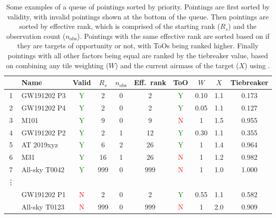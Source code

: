 \begin{colsection}
\begin{colsection}
\begin{table}[t]
    \begin{center}
        \begin{tabular}{c|l|c|ccc|c|ccc} %
            & Name & Valid & $R_s$ & $n_\text{obs}$ & Eff.\ rank & ToO & $W$ & $X$ & Tiebreaker \\
            \midrule
            1 & GW191202 P3   & \textcolor{Green}{Y} &  2  & 0 &   2 & \textcolor{Green}{Y} & 0.10 & 1.1 & 0.173 \\
            2 & GW191202 P4   & \textcolor{Green}{Y} &  2  & 0 &   2 & \textcolor{Green}{Y} & 0.05 & 1.1 & 0.127 \\
            3 &         M101  & \textcolor{Green}{Y} &  9  & 0 &   9 &   \textcolor{Red}{N} &    1 & 1.5 & 0.955 \\
            4 & GW191202 P2   & \textcolor{Green}{Y} &  2  & 1 &  12 & \textcolor{Green}{Y} & 0.30 & 1.1 & 0.355 \\
            5 &   AT 2019xyz  & \textcolor{Green}{Y} &  6  & 2 &  26 & \textcolor{Green}{Y} &    1 & 1.4 & 0.964 \\
            6 &          M31  & \textcolor{Green}{Y} &  16 & 1 &  26 &   \textcolor{Red}{N} &    1 & 1.2 & 0.982 \\
            7 & All-sky T0042 & \textcolor{Green}{Y} & 999 & 0 & 999 &   \textcolor{Red}{N} &    1 & 1.0 & 1.000 \\
            \vdots & & & & & & \\
              &  GW191202 P1  &   \textcolor{Red}{N} &   2 & 0 &   2 & \textcolor{Green}{Y} & 0.55 & 1.1 & 0.582 \\
              & All-sky T0123 &   \textcolor{Red}{N} & 999 & 0 & 999 &   \textcolor{Red}{N} &    1 & 2.0 & 0.909 \\
        \end{tabular}
    \end{center}
    \caption[Examples of sorting pointings by priority]{
        Some examples of a queue of pointings sorted by priority. Pointings are first sorted by validity, with invalid pointings shown at the bottom of the queue. Then pointings are sorted by effective rank, which is comprised of the starting rank ($R_s$) and the observation count ($n_\text{obs}$). Pointings with the same effective rank are sorted based on if they are targets of opportunity or not, with ToOs being ranked higher. Finally pointings with all other factors being equal are ranked by the tiebreaker value, based on combining any tile weighting ($W$) and the current airmass of the target ($X$) using .
    }\label{tab:priority}
\end{table}

\end{colsection}


\end{colsection}

